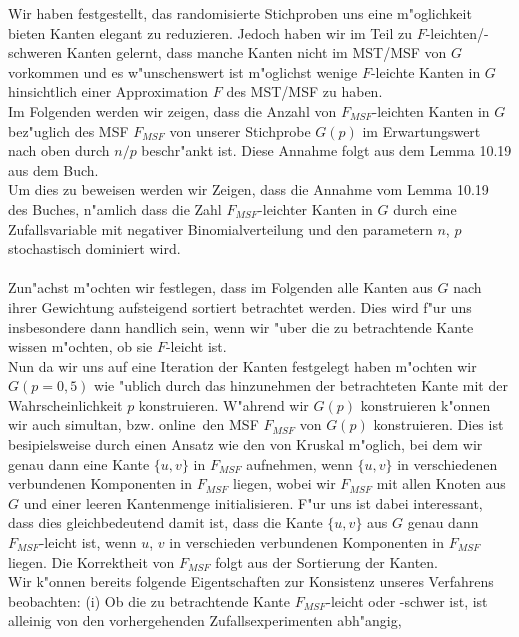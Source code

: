 Wir haben festgestellt, das randomisierte Stichproben uns eine m"oglichkeit 
    bieten Kanten elegant zu reduzieren.
    Jedoch haben wir im Teil zu $F$-leichten/-schweren Kanten gelernt, dass
    manche Kanten nicht im MST/MSF von $G$ vorkommen und es w"unschenswert
    ist m"oglichst wenige $F$-leichte Kanten in $G$ hinsichtlich einer 
    Approximation $F$ des MST/MSF zu haben.\\
Im Folgenden werden wir zeigen, dass die Anzahl von $F_{MSF}$-leichten Kanten in $G$ 
    bez"uglich des MSF $F_{MSF}$ von unserer Stichprobe $G(p)$ im Erwartungswert 
    nach oben durch $n/p$ beschr"ankt ist. 
    Diese Annahme folgt aus dem Lemma 10.19 aus dem Buch.\\
Um dies zu beweisen werden wir Zeigen, dass die Annahme vom Lemma 10.19 des
    Buches, n"amlich dass die Zahl $F_{MSF}$-leichter Kanten in $G$ durch
    eine Zufallsvariable mit negativer Binomialverteilung und den parametern
    $n$, $p$ stochastisch dominiert wird.\\
\\
Zun"achst m"ochten wir festlegen, dass im Folgenden alle Kanten aus $G$ nach 
    ihrer Gewichtung aufsteigend sortiert betrachtet werden.
    Dies wird f"ur uns insbesondere dann handlich sein, wenn wir "uber die zu 
    betrachtende Kante wissen m"ochten, ob sie $F$-leicht ist.\\
Nun da wir uns auf eine Iteration der Kanten festgelegt haben m"ochten wir 
    $G(p=0,5)$ wie "ublich durch das hinzunehmen der betrachteten Kante mit
    der Wahrscheinlichkeit $p$ konstruieren.
    W"ahrend wir $G(p)$ konstruieren k"onnen wir auch simultan, bzw. 
    \glqq online\grqq\ den MSF $F_{MSF}$ von $G(p)$ konstruieren.
    Dies ist besipielsweise durch einen Ansatz wie den von Kruskal m"oglich, bei
    dem wir genau dann eine Kante $\{u,v\}$ in $F_{MSF}$ aufnehmen, wenn $\{u,v\}$
    in verschiedenen verbundenen Komponenten in $F_{MSF}$ liegen, wobei wir 
    $F_{MSF}$ mit allen Knoten aus $G$ und einer leeren Kantenmenge 
    initialisieren.
    F"ur uns ist dabei interessant, dass dies gleichbedeutend damit ist, dass die Kante 
    $\{u,v\}$
    aus $G$ genau dann $F_{MSF}$-leicht ist, wenn $u$, $v$ in verschieden 
    verbundenen Komponenten in $F_{MSF}$ liegen.
    Die Korrektheit von $F_{MSF}$ folgt aus der Sortierung der Kanten.\\
Wir k"onnen bereits folgende Eigentschaften zur Konsistenz unseres Verfahrens
    beobachten: 
    (i) Ob die zu betrachtende Kante $F_{MSF}$-leicht oder -schwer ist, 
    ist alleinig von den vorhergehenden Zufallsexperimenten abh"angig,
